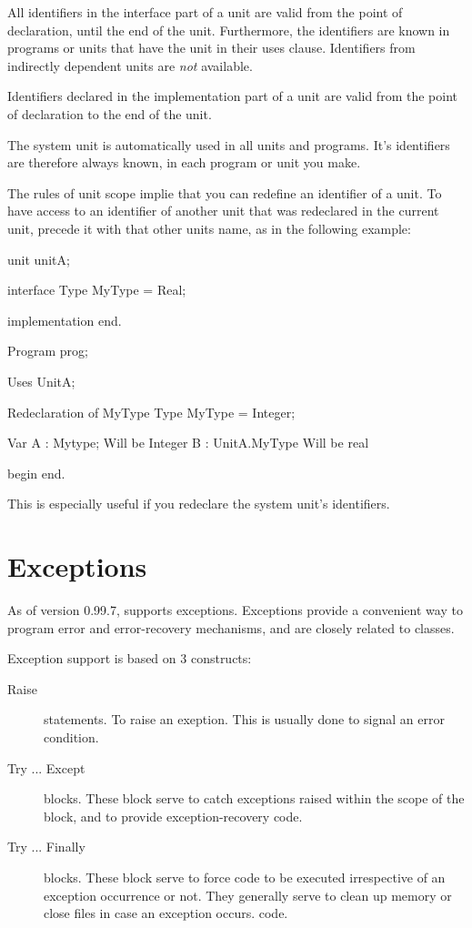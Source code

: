 \documentclass{report}
\begin{document}
All identifiers in the interface part of a unit are valid from the point of
declaration, until the end of the unit. Furthermore, the identifiers are
known in programs or units that have the unit in their uses clause.
Identifiers from indirectly dependent units are {\em not} available.

Identifiers declared in the implementation part of a unit are valid from the
point of declaration to the end of the unit.

The system unit is automatically used in all units and programs. 
It's identifiers are therefore always known, in each program or unit 
you make.

The rules of unit scope implie that you can redefine an identifier of a
unit. To have access to an identifier of another unit that was redeclared in 
the current unit, precede it with that other units name, as in the following
example:

\begin{listing}
unit unitA;

interface
Type
  MyType = Real;

implementation
end.

Program prog;

Uses UnitA;
 
{ Redeclaration of MyType}
Type MyType = Integer;

Var A : Mytype;      { Will be Integer }
    B : UnitA.MyType { Will be real }

begin
end.
\end{listing}
This is especially useful if you redeclare the system unit's identifiers.


\chapter{Exceptions}
\label{ch:Exceptions}

As of version 0.99.7, \fpc supports exceptions. Exceptions provide a
convenient way to program error and error-recovery mechanisms, and are
closely related to classes. 

Exception support is based on 3 constructs:
\begin{description}
\item [Raise\ ] statements. To raise an exeption. This is usually done to signal an
error condition.
\item [Try ... Except\ ] blocks. These block serve to catch exceptions
raised within the scope of the block, and to provide exception-recovery 
code.
\item [Try ... Finally\ ] blocks. These block serve to force code to be
executed irrespective of an exception occurrence or not. They generally
serve to clean up memory or close files in case an exception occurs. 
code.
\end{description}
\end{document}
